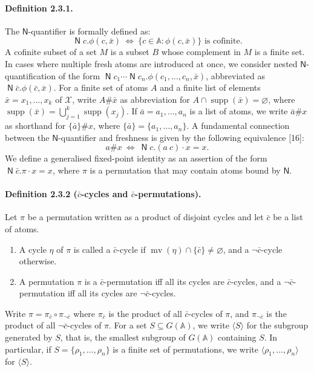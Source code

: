 \documentclass[10pt,a4paper]{amsart}
\newcommand{\newq}{\mathop{\mathsf N}}
\begin{document}
\paragraph{Definition 2.3.1.} The $\mathsf N$-quantifier is formally defined as:
\[
\newq c.\phi(c,\bar x)\ \Longleftrightarrow\ \{c\in\mathbb A:\phi(c,\bar x)\}\text{ is cofinite}.
\]
A cofinite subset of a set $M$ is a subset $B$ whose complement in $M$ is a finite set.
In cases where multiple fresh atoms are introduced at once, we consider nested $\mathsf N$-quantification of the form $\newq c_1\cdots\newq c_n.\phi(c_1,\ldots,c_n,\bar x)$, abbreviated as $\newq\bar c.\phi(\bar c,\bar x)$.
For a finite set of atoms $A$ and a finite list of elements $\bar x=x_1,\ldots,x_k$ of $\mathcal X$, write $A\#\bar x$ as abbreviation for $A\cap\operatorname{supp}(\bar x)=\varnothing$, where $\operatorname{supp}(\bar x)=\bigcup_{j=1}^k\operatorname{supp}(x_j)$.
If $\bar a=a_1,\ldots,a_n$ is a list of atoms, we write $\bar a\#x$ as shorthand for $\{\bar a\}\#x$, where $\{\bar a\}=\{a_1,\ldots,a_n\}$.
A fundamental connection between the $\mathsf N$-quantifier and freshness is given by the following equivalence [16]:
\[
a\#x\ \Longleftrightarrow\ \newq c.(a\ c)\cdot x=x.
\]
We define a generalised fixed-point identity as an assertion of the form $\newq\bar c.\pi\cdot x=x$, where $\pi$ is a permutation that may contain atoms bound by $\mathsf N$.
\paragraph{Definition 2.3.2 ($\bar c$-cycles and $\bar c$-permutations).}
Let $\pi$ be a permutation written as a product of disjoint cycles and let $\bar c$ be a list of atoms.
\begin{enumerate}
\item A cycle $\eta$ of $\pi$ is called a $\bar c$-cycle if $\operatorname{mv}(\eta)\cap\{\bar c\}\ne\varnothing$, and a $\neg\bar c$-cycle otherwise.
\item A permutation $\pi$ is a $\bar c$-permutation iff all its cycles are $\bar c$-cycles, and a $\neg\bar c$-permutation iff all its cycles are $\neg\bar c$-cycles.
\end{enumerate}
Write $\pi=\pi_{\bar c}\circ\pi_{\neg\bar c}$ where $\pi_{\bar c}$ is the product of all $\bar c$-cycles of $\pi$, and $\pi_{\neg\bar c}$ is the product of all $\neg\bar c$-cycles of $\pi$.
For a set $S\subseteq G(\mathbb A)$, we write $\langle S\rangle$ for the subgroup generated by $S$, that is, the smallest subgroup of $G(\mathbb A)$ containing $S$.
In particular, if $S=\{\rho_1,\ldots,\rho_n\}$ is a finite set of permutations, we write $\langle\rho_1,\ldots,\rho_n\rangle$ for $\langle S\rangle$.
\end{document}
